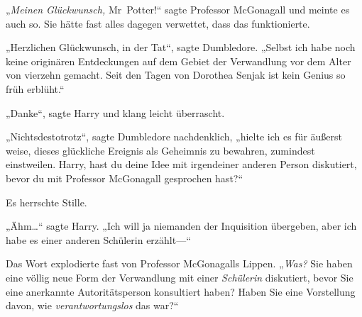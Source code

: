 „\emph{Meinen Glückwunsch,} Mr~Potter!“ sagte Professor McGonagall und meinte es auch so. Sie hätte fast alles dagegen verwettet, dass das funktionierte.

„Herzlichen Glückwunsch, in der Tat“, sagte Dumbledore. „Selbst ich habe noch keine originären Entdeckungen auf dem Gebiet der Verwandlung vor dem Alter von vierzehn gemacht. Seit den Tagen von Dorothea Senjak ist kein Genius so früh erblüht.“%

„Danke“, sagte Harry und klang leicht überrascht.

„Nichtsdestotrotz“, sagte Dumbledore nachdenklich, „hielte ich es für äußerst weise, dieses glückliche Ereignis als Geheimnis zu bewahren, zumindest einstweilen. Harry, hast du deine Idee mit irgendeiner anderen Person diskutiert, bevor du mit Professor McGonagall gesprochen hast?“

Es herrschte Stille.

„Ähm…“ sagte Harry. „Ich will ja niemanden der Inquisition übergeben, aber ich habe es einer anderen Schülerin erzählt—“

Das Wort explodierte fast von Professor McGonagalls Lippen. „\emph{Was?} Sie haben eine völlig neue Form der Verwandlung mit einer \emph{Schülerin} diskutiert, bevor Sie eine anerkannte Autoritätsperson konsultiert haben? Haben Sie eine Vorstellung davon, wie \emph{verantwortungslos} das war?“

